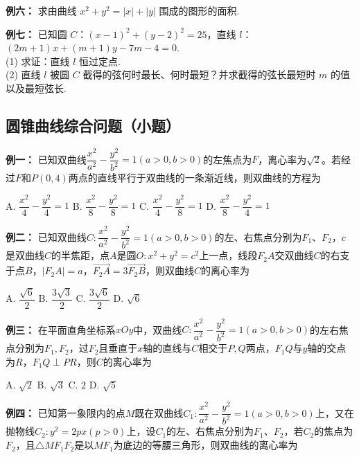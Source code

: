 \documentclass{article}
\begin{document}
\noindent\textbf{例六： }求由曲线 $x^2+y^2=|x|+|y|$ 围成的图形的面积.   \vspace{2\baselineskip}

\noindent\textbf{例七： }已知圆 $C$：$(x-1)^2+(y-2)^2=25$，直线 $l$：$(2m+1)x+(m+1)y-7m-4=0$.\\
(1) 求证：直线 $l$ 恒过定点.\\
(2) 直线 $l$ 被圆 $C$ 截得的弦何时最长、何时最短？并求截得的弦长最短时 $m$ 的值以及最短弦长.   \vspace{2\baselineskip}
\newpage
\subsection{圆锥曲线综合问题（小题）}
\vspace{2\baselineskip}

\noindent\textbf{例一：} 已知双曲线$\dfrac{x^2}{a^2}-\dfrac{y^2}{b^2}=1(a>0,b>0)$的左焦点为$F$，离心率为$\sqrt{2}$。若经过$F$和$P(0,4)$两点的直线平行于双曲线的一条渐近线，则双曲线的方程为
\vspace{0.5em}

A. $\dfrac{x^2}{4}-\dfrac{y^2}{4}=1$ \quad B. $\dfrac{x^2}{8}-\dfrac{y^2}{8}=1$ \quad C. $\dfrac{x^2}{4}-\dfrac{y^2}{8}=1$ \quad D. $\dfrac{x^2}{8}-\dfrac{y^2}{4}=1$
\vspace{4\baselineskip}

\noindent\textbf{例二：} 已知双曲线$C:\dfrac{x^2}{a^2}-\dfrac{y^2}{b^2}=1(a>0,b>0)$的左、右焦点分别为$F_1$、$F_2$，$c$是双曲线$C$的半焦距，点$A$是圆$O:x^2+y^2=c^2$上一点，线段$F_2A$交双曲线$C$的右支于点$B$，$|F_2A|=a$，$\overrightarrow{F_2A}=3\overrightarrow{F_2B}$，则双曲线$C$的离心率为
\vspace{0.5em}

A. $\dfrac{\sqrt{6}}{2}$ \quad B. $\dfrac{3\sqrt{3}}{2}$ \quad C. $\dfrac{3\sqrt{6}}{2}$ \quad D. $\sqrt{6}$
\vspace{4\baselineskip}

\noindent\textbf{例三：} 在平面直角坐标系$xOy$中，双曲线$C:\dfrac{x^2}{a^2}-\dfrac{y^2}{b^2}=1(a>0,b>0)$的左右焦点分别为$F_1,F_2$，过$F_2$且垂直于$x$轴的直线与$C$相交于$P,Q$两点，$F_1Q$与$y$轴的交点为$R$，$F_1Q \perp PR$，则$C$的离心率为
\vspace{0.5em}

A. $\sqrt{2}$ \quad B. $\sqrt{3}$ \quad C. $2$ \quad D. $\sqrt{5}$
\vspace{4\baselineskip}

\noindent\textbf{例四：} 已知第一象限内的点$M$既在双曲线$C_1:\dfrac{x^2}{a^2}-\dfrac{y^2}{b^2}=1(a>0,b>0)$上，又在抛物线$C_2:y^2=2px(p>0)$上，设$C_1$的左、右焦点分别为$F_1$、$F_2$，若$C_2$的焦点为$F_2$，且$\triangle MF_1F_2$是以$MF_1$为底边的等腰三角形，则双曲线的离心率为
\vspace{0.5em}
\end{document}
